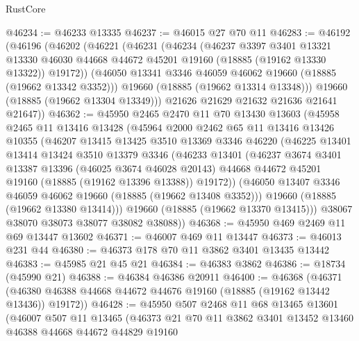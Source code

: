 \begin{lexlean}{RustCore}
\begin{coremodule}
@46234 := @46233 @13335
@46237 := @46015 @27 @70 @11
@46283 := @46192
    (@46196
      (@46202
        (@46221
          (@46231
            (@46234
              (@46237
                @3397
                @3401
                @13321
                @13330
                @46030
                @44668
                @44672
                @45201
                @19160
                (@18885 (@19162 @13330 @13322))
                @19172))
            (@46050 @13341 @3346 @46059 @46062 @19660 (@18885 (@19662 @13342 @3352)))
            @19660
            (@18885 (@19662 @13314 @13348)))
          @19660
          (@18885 (@19662 @13304 @13349)))
        @21626
        @21629
        @21632
        @21636
        @21641
        @21647))
@46362 := @45950
    @2465
    @2470
    @11
    @70
    @13430
    @13603
    (@45958
      @2465
      @11
      @13416
      @13428
      (@45964
        @2000
        @2462
        @65
        @11
        @13416
        @13426
        @10355
        (@46207
          @13415
          @13425
          @3510
          @13369
          @3346
          @46220
          (@46225
            @13401
            @13414
            @13424
            @3510
            @13379
            @3346
            (@46233
              @13401
              (@46237
                @3674
                @3401
                @13387
                @13396
                (@46025 @3674 @46028 @20143)
                @44668
                @44672
                @45201
                @19160
                (@18885 (@19162 @13396 @13388))
                @19172))
            (@46050 @13407 @3346 @46059 @46062 @19660 (@18885 (@19662 @13408 @3352)))
            @19660
            (@18885 (@19662 @13380 @13414)))
          @19660
          (@18885 (@19662 @13370 @13415)))
        @38067
        @38070
        @38073
        @38077
        @38082
        @38088))
@46368 := @45950 @469 @2469 @11 @69 @13447 @13602
@46371 := @46007 @469 @11 @13447
@46373 := @46013 @231 @44
@46380 := @46373 @178 @70 @11 @3862 @3401 @13435 @13442
@46383 := @45985 @21 @45 @21
@46384 := @46383 @3862
@46386 := @18734 (@45990 @21)
@46388 := @46384 @46386 @20911
@46400 := @46368
    (@46371 (@46380 @46388 @44668 @44672 @44676 @19160 (@18885 (@19162 @13442 @13436)) @19172))
@46428 := @45950
    @507
    @2468
    @11
    @68
    @13465
    @13601
    (@46007
      @507
      @11
      @13465
      (@46373
        @21
        @70
        @11
        @3862
        @3401
        @13452
        @13460
        @46388
        @44668
        @44672
        @44829
        @19160

\end{coremodule}
\end{lexlean}
